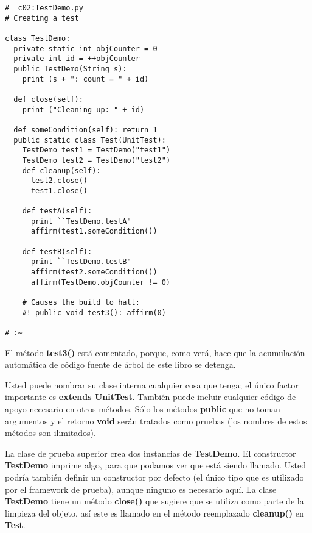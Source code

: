 \begin{lstlisting}
#  c02:TestDemo.py 
# Creating a test 

class TestDemo: 
  private static int objCounter = 0 
  private int id = ++objCounter 
  public TestDemo(String s): 
    print (s + ": count = " + id)
    
  def close(self): 
    print ("Cleaning up: " + id) 
    
  def someCondition(self): return 1  
  public static class Test(UnitTest): 
    TestDemo test1 = TestDemo("test1") 
    TestDemo test2 = TestDemo("test2") 
    def cleanup(self):  
      test2.close() 
      test1.close() 
      
    def testA(self):  
      print ``TestDemo.testA"
      affirm(test1.someCondition()) 
      
    def testB(self):  
      print ``TestDemo.testB"
      affirm(test2.someCondition()) 
      affirm(TestDemo.objCounter != 0) 
      
    # Causes the build to halt: 
    #! public void test3(): affirm(0)  
    
# :~ 
\end{lstlisting}

El método \textbf{test3()} está comentado, porque, como verá, hace que la acumulación automática de código fuente de árbol de este libro se detenga.  \newline

Usted puede nombrar su clase interna cualquier cosa que tenga; el único factor importante es \textbf{extends UnitTest}. También puede incluir cualquier código de apoyo necesario en otros métodos. Sólo los métodos \textbf{public} que no toman argumentos y el retorno \textbf{void} serán tratados como pruebas (los nombres de estos métodos son ilimitados).  \newline

La clase de prueba superior crea dos instancias de \textbf{TestDemo}. El constructor \textbf{TestDemo}  imprime algo, para que podamos ver que está siendo llamado. Usted podría también definir un constructor por defecto (el único tipo que es utilizado por el framework de prueba), aunque ninguno es necesario aquí. La clase \textbf{TestDemo} tiene un método \textbf{close()} que sugiere que se utiliza como parte de la limpieza del objeto, así este es llamado en el método reemplazado
\textbf{cleanup()} en \textbf{Test}.   \newline

